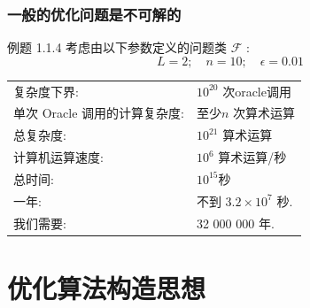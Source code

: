 \documentclass[handout]{beamer}
\begin{document}
\begin{frame}
\frametitle{一般的优化问题是不可解的}


\begin{example}
例题 1.1.4 考虑由以下参数定义的问题类 $\mathcal{F}$ :
\begin{equation*}
    L = 2;\quad n = 10;\quad \epsilon = 0.01
\end{equation*}

\begin{tabular}{ll}
复杂度下界: &  $10_{}^{20}$ 次oracle调用 \\
单次 Oracle 调用的计算复杂度: & 至少$n$ 次算术运算 \\
总复杂度: & $10_{}^{21}$ 算术运算 \\
计算机运算速度: & $10^6$ 算术运算/秒 \\
总时间: & $10^{15}$秒 \\
一年: & 不到 $3.2 \times 10^7$ 秒. \\
我们需要: & 32 000 000 年. \\
\end{tabular}


\end{example}

\end{frame}





\section{优化算法构造思想}
\end{document}
